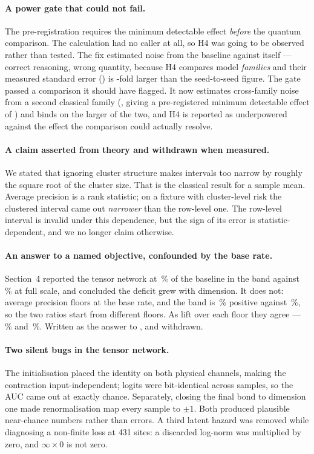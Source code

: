 \paragraph{A power gate that could not fail.} The pre-registration requires the minimum
detectable effect \emph{before} the quantum comparison. The calculation had no caller at all,
so H4 was going to be observed rather than tested. The fix estimated noise from the baseline
against itself --- correct reasoning, wrong quantity, because H4 compares model \emph{families}
and their measured standard error (\ClaimMpsStandardErrorBestChi) is \ClaimPowerSeRatio{}-fold
larger than the seed-to-seed figure. The gate passed a comparison it should have flagged. It
now estimates cross-family noise from a second classical family (\ClaimPowerSeCrossFamily{},
giving a pre-registered minimum detectable effect of \ClaimPowerMde{}) and binds on the larger
of the two, and H4 is reported as underpowered against the effect the comparison could
actually resolve.

\paragraph{A claim asserted from theory and withdrawn when measured.} We stated that ignoring
cluster structure makes intervals too narrow by roughly the square root of the cluster size.
That is the classical result for a sample mean. Average precision is a rank statistic; on a
fixture with cluster-level risk the clustered interval came out \emph{narrower} than the
row-level one. The row-level interval is invalid under this
dependence, but the sign of its error is statistic-dependent, and we no longer claim otherwise.

\paragraph{An answer to a named objective, confounded by the base rate.} Section~4 reported the
tensor network at \ClaimMpsShareBand\,\% of the baseline in the band against
\ClaimMpsShareFull\,\% at full scale, and concluded the deficit grew with dimension. It does
not: average precision floors at the base rate, and the band is \ClaimBandFraudRate\,\%
positive against \ClaimTestFraudRate\,\%, so the two ratios start from different floors. As
lift over each floor they agree --- \ClaimMpsLiftShareBand\,\% and \ClaimMpsLiftShareFull\,\%.
Written as the answer to , and withdrawn.

\paragraph{Two silent bugs in the tensor network.} The initialisation placed the identity on
both physical channels, making the contraction input-independent; logits were bit-identical
across samples, so the AUC came out at exactly chance. Separately, closing the final bond to
dimension one made renormalisation map every sample to $\pm 1$. Both produced plausible
near-chance numbers rather than errors. A third latent hazard was removed while diagnosing a
non-finite loss at 431 sites: a discarded log-norm was multiplied by zero, and
$\infty \times 0$ is not zero.
